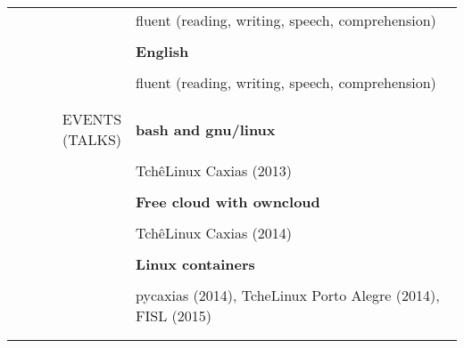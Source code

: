 \begin{tabular}{rp{12cm}}
    & fluent (reading, writing, speech, comprehension) \\\\
    & \textbf{English} \\\\
    & fluent (reading, writing, speech, comprehension)
    \\\\
    \hline
    \\
    \uppercase{Events (talks)}
    & \textbf{bash and gnu/linux} \\\\
    & TchêLinux Caxias (2013) \\\\
    & \textbf{Free cloud with owncloud} \\\\
    & TchêLinux Caxias (2014) \\\\
    & \textbf{Linux containers} \\\\
    & pycaxias (2014), TcheLinux Porto Alegre (2014), FISL (2015)
    \\\\
    \hline
    \\
\end{tabular}
